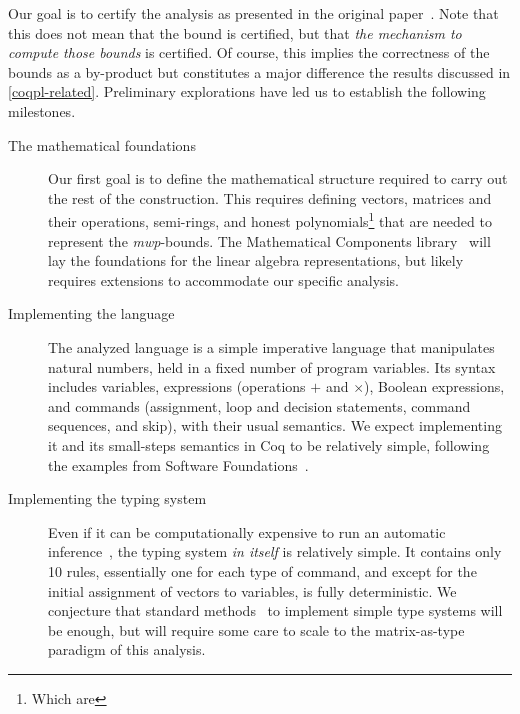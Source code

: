 Our goal is to certify the analysis as presented in {the original paper}~\cite{jones2009}.
Note that this does not mean that the bound is certified, but that \emph{the mechanism to compute those bounds} is certified.
Of course, this implies the correctness of the bounds as a by-product but constitutes a major difference \wrt the results discussed in \autoref{coqpl-related}.
Preliminary explorations have led us to establish the following milestones.

\begin{description}
\item[The mathematical foundations]
Our first goal is to define the mathematical structure required to carry out the rest of the construction.
This requires defining vectors, matrices and their operations, semi-rings, and honest polynomials\footnote{%
Which are } that are needed to represent the \emph{mwp}-bounds.
The Mathematical Components library~\cite{mahboubi2022,mathcomp} will lay the foundations for the linear algebra representations, but likely requires extensions to accommodate our specific analysis.

\item[Implementing the language]
The analyzed language is a simple imperative language that manipulates natural numbers, held in a fixed number of program variables.
Its syntax includes variables, expressions (operations \(+\) and \(\times\)), Boolean expressions, and commands
(\eg  assignment, loop and decision statements, command sequences, and skip), with their usual semantics.
We expect implementing it and its small-steps semantics in Coq to be relatively simple, following the examples from Software Foundations~\cite{cpierce20221,cpierce20222}.

\item[Implementing the typing system]
Even if it can be computationally expensive to run an automatic inference~\cite{aubert2023b}, the typing system \emph{in itself} is relatively simple.
It contains only 10 rules, essentially one for each type of command, and except for the initial assignment of vectors to variables, is fully deterministic.
We conjecture that standard methods~\cite{chlipala2022, chlipala2010} to implement simple type systems will be enough, but will require some care to scale to the matrix-as-type paradigm of this analysis.


\end{description}
